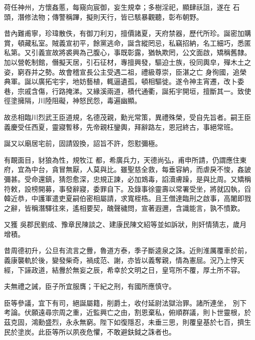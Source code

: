\begin{pinyinscope}
 荷任神州，方懷姦慝，每窺向宸御，妄生規幸；多樹淫祀，顯肆祅詛，遂在
 石頭，潛修法物；傳警稱蹕，擬則天行，皆已駭暴觀聽，彰布朝野。



 昔內難甫寧，珍瑋散佚，有御刀利刃，擅價諸夏，天府禁器，歷代所珍。誕密加購賞，頓藏私室。賊義宣初平，餘黨逃命，誕含縱罔忌，私竊招納，名工細巧，悉匿私第。又引義宣故將裘興為己腹心，事既彰露，猶執欺罔，公文面啟，矯稱舊隸。加以營乾制館，僭擬天居，引石征材，專擅興發，驅迫士族，役同輿皁，殫木土之姿，窮吞并之勢。故會稽宣長公主受遇二祖，禮級尊崇，臣湛之亡
 身徇國，追榮典軍。誕以廣拓宅宇，地妨藝植，輒逼遺孤，頓相驅徙。遂令神主宵遷，改卜委巷，宗戚含傷，行路掩涕。又緣溪兩道，積代通衢，誕拓宇開垣，擅斷其一。致使徑塗擁隔，川陸阻礙，神怒民怨，毒遍幽顯。



 故丞相臨川烈武王臣道規，名德茂親，勳光常策，異禮殊榮，受自先旨者。嗣王臣義慶受任西夏，靈寢暫移，先帝親枉鑾輿，拜辭路左，恩冠終古，事絕常班。



 誕又以廟居宅前，固請毀換，詔旨不許，怨懟彌極。



 有靦面目，豺狼為性，規牧江
 都，希廣兵力，天德尚弘，甫申所請，仍謂應住東府，宜為中台，貪冒無厭，人莫與比。雖聖慈全救，每垂容納，而虐戾不悛，姦詖彌甚。受命還鎮，猜怨愈深，忠規正諫，必加鴆毒，諂瀆膚躁，是與比周。又矯稱符敕，設榜開募，事發辭寢，委罪自下。及錄事徐靈壽以常署受坐，將就囚執，舀韓近恭，中護軍遣吏夏嗣伯密相屬請，求寬桎梏。且王僧達臨刑之啟事，高闍即戮之辭，皆稱潛驛往來，遙相要契，醜聲穢問，宣著遐邇，含識能言，孰不憤歎。



 又獲
 吳郡民劉成、豫章民陳談之、建康民陳文紹等並如訴狀，則奸情猜志，歲月增積。



 昔周德初升，公旦有流言之釁，魯道方泰，季子斷逵泉之誅。近則淮厲覆車於前，義康襲軌於後，變發柴奇，禍成范、謝，亦皆以義奪親，情為憲屈。況乃上悖天經，下誣政道，結釁於無妄之辰，希幸於文明之日，皇穹所不覆，厚土所不容。



 夫無禮之誡，臣子所宜服膺；干紀之刑，有國所應慎守。



 臣等參議，宜下有司，絕誕屬籍，削爵土，收付延尉法獄治罪。諸所連坐，
 別下考論。伏願遠尋宗周之重，近監興亡之由，割恩棄私，俯順群議，則卜世靈根，於茲克固，鴻勳盛烈，永永無窮。陛下如復隱忍，未垂三思，則覆皇基於七百，擠生民於塗炭。此臣等所以夙夜危懼，不敢避鈇鉞之誅者也。




\end{pinyinscope}

